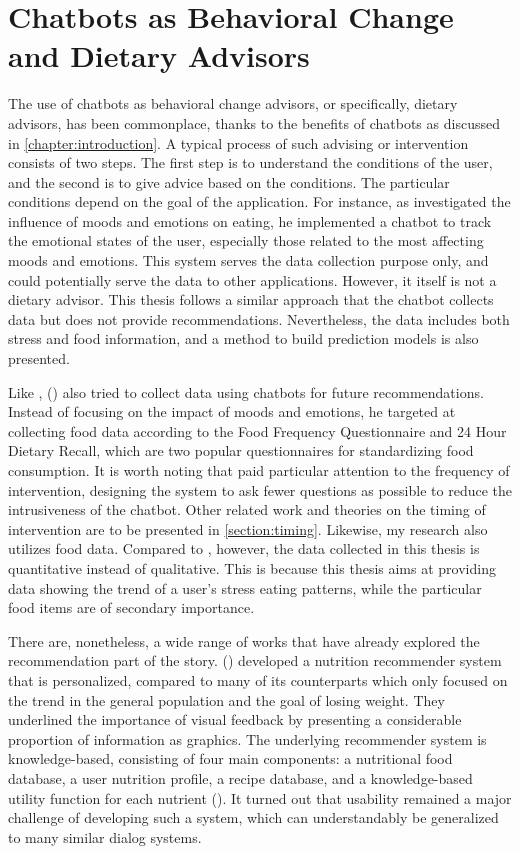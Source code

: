 \section{Chatbots as Behavioral Change and Dietary Advisors}
The use of chatbots as behavioral change advisors, or specifically, dietary advisors, has been commonplace, thanks to the benefits of chatbots as discussed in \autoref{chapter:introduction}. A typical process of such advising or intervention consists of two steps. The first step is to understand the conditions of the user, and the second is to give advice based on the conditions. The particular conditions depend on the goal of the application. For instance, as \citeauthor{16_martin} investigated the influence of moods and emotions on eating, he implemented a chatbot to track the emotional states of the user, especially those related to the most affecting moods and emotions. This system serves the data collection purpose only, and could potentially serve the data to other applications. However, it itself is not a dietary advisor. This thesis follows a similar approach that the chatbot collects data but does not provide recommendations. Nevertheless, the data includes both stress and food information, and a method to build prediction models is also presented. \bigskip

\noindent Like \citeauthor{16_martin}, \citeauthor{17_ludwig} (\citeyear{17_ludwig}) also tried to collect data using chatbots for future recommendations. Instead of focusing on the impact of moods and emotions, he targeted at collecting food data according to the Food Frequency Questionnaire and 24 Hour Dietary Recall, which are two popular questionnaires for standardizing food consumption. It is worth noting that \citeauthor{17_ludwig} paid particular attention to the frequency of intervention, designing the system to ask fewer questions as possible to reduce the intrusiveness of the chatbot. Other related work and theories on the timing of intervention are to be presented in \autoref{section:timing}. Likewise, my research also utilizes food data. Compared to \citeauthor{17_ludwig}, however, the data collected in this thesis is quantitative instead of qualitative. This is because this thesis aims at providing data showing the trend of a user's stress eating patterns, while the particular food items are of secondary importance.\bigskip

\noindent There are, nonetheless, a wide range of works that have already explored the recommendation part of the story. \citeauthor{18_nutrilize} (\citeyear{18_nutrilize}) developed a nutrition recommender system that is personalized, compared to many of its counterparts which only focused on the trend in the general population and the goal of losing weight. They underlined the importance of visual feedback by presenting a considerable proportion of information as graphics. The underlying recommender system is knowledge-based, consisting of four main components: a nutritional food database, a user nutrition profile, a recipe database, and a knowledge-based utility function for each nutrient (\cite{18_nutrilize}). It turned out that usability remained a major challenge of developing such a system, which can understandably be generalized to many similar dialog systems.

